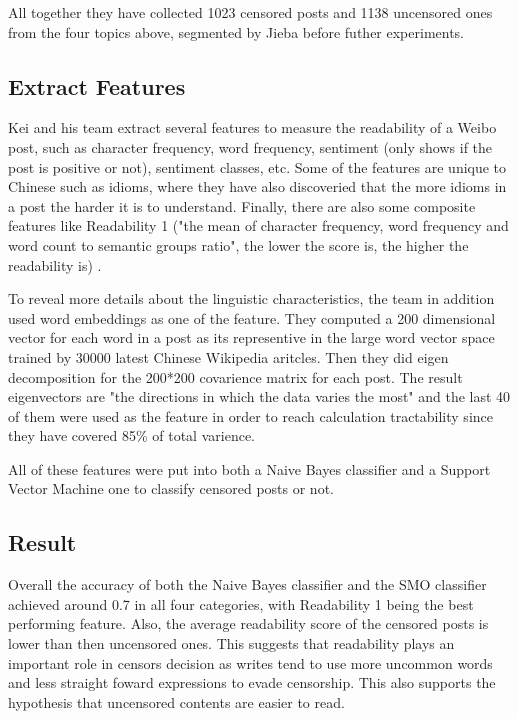 \documentclass[11pt]{article} %
\begin{document}
All together they have collected 1023 censored posts and 1138 uncensored ones from the four topics above, segmented by Jieba before futher experiments.

\subsection{Extract Features}

Kei and his team extract several features to measure the readability of a Weibo post, such as character frequency, word frequency, sentiment (only shows if the post is positive or not), sentiment classes, etc. Some of the features are unique to Chinese such as idioms, where they have also discoveried that the more idioms in a post the harder it is to understand. Finally, there are also some composite features like Readability 1 ("the mean of character frequency, word frequency and word count to semantic groups ratio", the lower the score is, the higher the readability is) \cite{ng2018linguistic}.

To reveal more details about the linguistic characteristics, the team in addition used word embeddings as one of the feature. They computed a 200 dimensional vector for each word in a post as its representive in the large word vector space trained by 30000 latest Chinese Wikipedia aritcles. Then they did eigen decomposition for the 200*200 covarience matrix for each post. The result eigenvectors are "the directions in which the data varies the most" and the last 40 of them were used as the feature in order to reach calculation tractability since they have covered 85\% of total varience.

All of these features were put into both a Naive Bayes classifier and a Support Vector Machine one to classify censored posts or not. 

\subsection{Result}

Overall the accuracy of both the Naive Bayes classifier and the SMO classifier achieved around 0.7 in all four categories, with Readability 1 being the best performing feature. Also, the average readability score of the censored posts is lower than then uncensored ones. This suggests that readability plays an important role in censors decision as writes tend to use more uncommon words and less straight foward expressions to evade censorship. This also supports the hypothesis that uncensored contents are easier to read.
\end{document}

